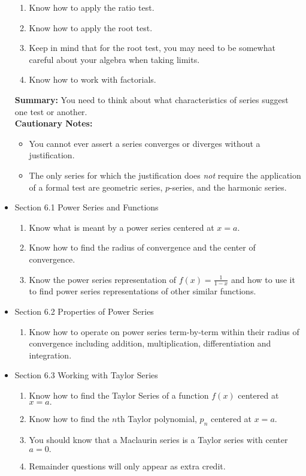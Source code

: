 \documentclass[11pt,fleqn]{article}
\begin{document}
\begin{itemize}
	\begin{enumerate}
	\item Know how to apply the ratio test.
	\item Know how to apply the root test.
	\item Keep in mind that for the root test, you may need to  be somewhat careful about your algebra when taking limits.
	\item Know how to work with factorials.
	\end{enumerate}
	
\textbf{Summary:} You need to think about what characteristics of series suggest one test or another. \\

\textbf{Cautionary Notes:}
	\begin{itemize}
	\item You cannot ever assert a series converges or diverges without a justification.
	\item The only series for which the justification does \emph{not} require the application of a formal test are geometric series, $p$-series, and the harmonic series.
	\end{itemize}

\item Section 6.1 Power Series and Functions\\

	\begin{enumerate}
	\item Know what is meant by a power series centered at $x=a.$
	\item Know how to find the radius of convergence and the center of convergence.
	\item Know the power series representation of $f(x)=\frac{1}{1-x}$ and how to use it to find power series representations of other similar functions.
	\end{enumerate}

\item Section 6.2 Properties of Power Series\\

	\begin{enumerate}
	\item Know how to operate on power series term-by-term within their radius of convergence including addition, multiplication, differentiation and integration.
	\end{enumerate}

\item Section 6.3 Working with Taylor Series\\

	\begin{enumerate}
	\item Know how to find the Taylor Series of a function $f(x)$ centered at $x=a.$
	\item Know how to find the $n$th Taylor polynomial, $p_n$ centered at $x=a.$
	\item You should know that a Maclaurin series is a Taylor series with center $a=0.$
	\item Remainder questions will only appear as extra credit.
	\end{enumerate}

\end{itemize}
\end{document}
